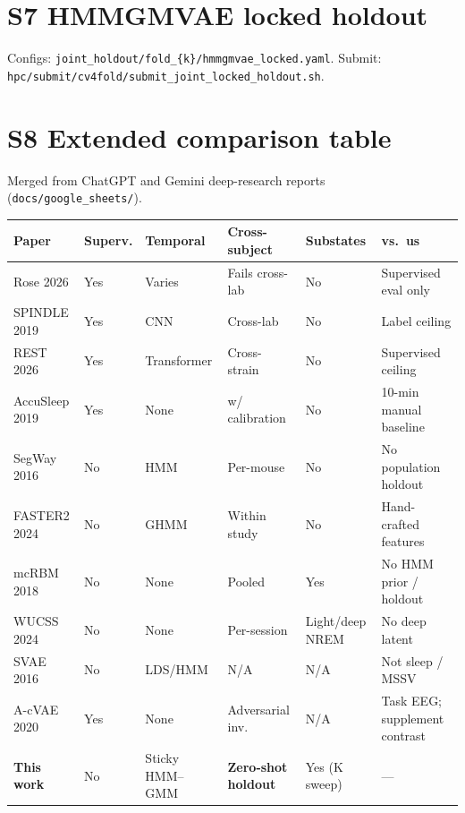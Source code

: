 \documentclass[10pt]{article}
\begin{document}
\section{S7 HMMGMVAE locked holdout}
Configs: \texttt{joint\_holdout/fold\_\{k\}/hmmgmvae\_locked.yaml}.
Submit: \texttt{hpc/submit/cv4fold/submit\_joint\_locked\_holdout.sh}.

\section{S8 Extended comparison table}
Merged from ChatGPT and Gemini deep-research reports (\texttt{docs/google\_sheets/}).

\small
\begin{longtable}{p{2.2cm}p{1.2cm}p{1.5cm}p{2cm}p{1.5cm}p{1.5cm}}
\toprule
Paper & Superv. & Temporal & Cross-subject & Substates & vs.\ us \\
\midrule
\endhead
Rose 2026 & Yes & Varies & Fails cross-lab & No & Supervised eval only \\
SPINDLE 2019 & Yes & CNN & Cross-lab & No & Label ceiling \\
REST 2026 & Yes & Transformer & Cross-strain & No & Supervised ceiling \\
AccuSleep 2019 & Yes & None & w/ calibration & No & 10-min manual baseline \\
SegWay 2016 & No & HMM & Per-mouse & No & No population holdout \\
FASTER2 2024 & No & GHMM & Within study & No & Hand-crafted features \\
mcRBM 2018 & No & None & Pooled & Yes & No HMM prior / holdout \\
WUCSS 2024 & No & None & Per-session & Light/deep NREM & No deep latent \\
SVAE 2016 & No & LDS/HMM & N/A & N/A & Not sleep / MSSV \\
A-cVAE 2020 & Yes & None & Adversarial inv. & N/A & Task EEG; supplement contrast \\
\textbf{This work} & No & Sticky HMM--GMM & \textbf{Zero-shot holdout} & Yes (K sweep) & --- \\
\bottomrule
\end{longtable}
\normalsize
\end{document}

